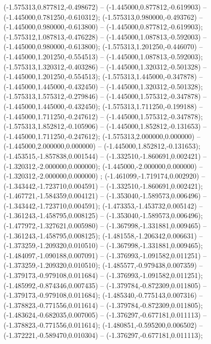  (-1.575313,0.877812,-0.498672) -- (-1.445000,0.877812,-0.619903) -- (-1.445000,0.781250,-0.610312);
 (-1.575313,0.980000,-0.493762) -- (-1.445000,0.980000,-0.613800) -- (-1.445000,0.877812,-0.619903);
 (-1.575312,1.087813,-0.476228) -- (-1.445000,1.087813,-0.592003) -- (-1.445000,0.980000,-0.613800);
 (-1.575313,1.201250,-0.446070) -- (-1.445000,1.201250,-0.554513) -- (-1.445000,1.087813,-0.592003);
 (-1.575313,1.320312,-0.403286) -- (-1.445000,1.320312,-0.501328) -- (-1.445000,1.201250,-0.554513);
 (-1.575313,1.445000,-0.347878) -- (-1.445000,1.445000,-0.432450) -- (-1.445000,1.320312,-0.501328);
 (-1.575313,1.575312,-0.279846) -- (-1.445000,1.575312,-0.347878) -- (-1.445000,1.445000,-0.432450);
 (-1.575313,1.711250,-0.199188) -- (-1.445000,1.711250,-0.247612) -- (-1.445000,1.575312,-0.347878);
 (-1.575313,1.852812,-0.105906) -- (-1.445000,1.852812,-0.131653) -- (-1.445000,1.711250,-0.247612);
 (-1.575313,2.000000,0.000000) -- (-1.445000,2.000000,0.000000) -- (-1.445000,1.852812,-0.131653);
 (-1.453515,-1.857838,0.001544) -- (-1.332510,-1.860691,0.002421) -- (-1.320312,-2.000000,0.000000);
 (-1.445000,-2.000000,0.000000) -- (-1.320312,-2.000000,0.000000) ;
 (-1.461099,-1.719174,0.002920) -- (-1.343442,-1.723710,0.004591) -- (-1.332510,-1.860691,0.002421);
 (-1.467721,-1.584359,0.004121) -- (-1.353040,-1.589573,0.006496) -- (-1.343442,-1.723710,0.004591);
 (-1.473353,-1.453732,0.005142) -- (-1.361243,-1.458795,0.008125) -- (-1.353040,-1.589573,0.006496);
 (-1.477972,-1.327621,0.005980) -- (-1.367998,-1.331881,0.009465) -- (-1.361243,-1.458795,0.008125);
 (-1.481558,-1.206342,0.006631) -- (-1.373259,-1.209320,0.010510) -- (-1.367998,-1.331881,0.009465);
 (-1.484097,-1.090188,0.007091) -- (-1.376993,-1.091582,0.011251) -- (-1.373259,-1.209320,0.010510);
 (-1.485577,-0.979438,0.007359) -- (-1.379173,-0.979108,0.011684) -- (-1.376993,-1.091582,0.011251);
 (-1.485992,-0.874346,0.007435) -- (-1.379784,-0.872309,0.011805) -- (-1.379173,-0.979108,0.011684);
 (-1.485340,-0.775143,0.007316) -- (-1.378823,-0.771556,0.011614) -- (-1.379784,-0.872309,0.011805);
 (-1.483624,-0.682035,0.007005) -- (-1.376297,-0.677181,0.011113) -- (-1.378823,-0.771556,0.011614);
 (-1.480851,-0.595200,0.006502) -- (-1.372221,-0.589470,0.010304) -- (-1.376297,-0.677181,0.011113);
